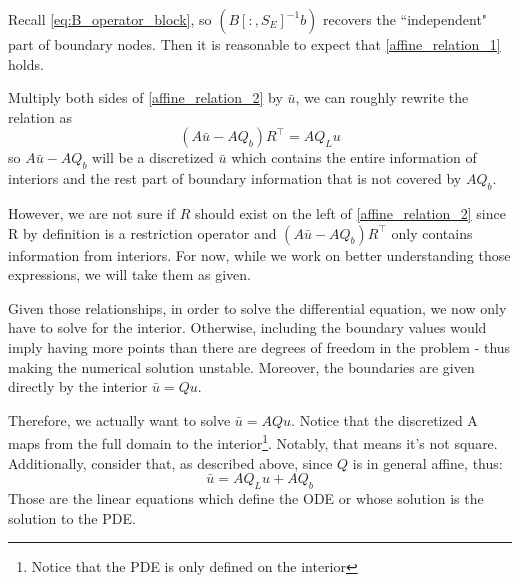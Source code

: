 \documentclass[11pt]{article}
\begin{document}
\begin{itemize}
		Recall \cref{eq:B_operator_block}, so $\left(B[:,S_E]^{-1} b \right)$ recovers the ``independent" part of boundary nodes. Then it is reasonable to expect that \cref{affine_relation_1} holds.

	Multiply both sides of \cref{affine_relation_2} by $\bar{u}$, we can roughly rewrite the relation as
	\begin{equation}
	(A \bar{u}-A  Q_b)  R^{\top} = A  Q_L u
	\end{equation}
	so $A \bar{u}-A   Q_b$ will be a discretized $\bar{u}$ which contains the entire information of interiors and the rest part of boundary information that is not covered by $A  Q_b$.

	However, we are not sure if $R$ should exist on the left of \cref{affine_relation_2} since R by definition is a restriction operator and $(A  \bar{u}-A  Q_b) R^{\top}$ only contains information from interiors.
	For now, while we work on better understanding those expressions, we will take them as given.


	Given those relationships, in order to solve the differential equation, we now only have to solve for the interior. Otherwise, including the boundary values would imply having more points than there are degrees of freedom in the problem - thus making the numerical solution unstable. Moreover, the boundaries are given directly by the interior $\bar{u} = Q u$.

	Therefore, we actually want to solve $\bar{u} = A Q u$. Notice that the discretized A maps from the full domain to the interior\footnote{Notice that the PDE is only defined on the interior}. Notably, that means it's not square. Additionally, consider that, as described above, since $Q$ is in general affine, thus:
	\begin{equation}
	\bar{u} = A Q_L u + A Q_b
	\end{equation}
	Those are the linear equations which define the ODE or whose solution is the solution to the PDE.
\end{itemize}
\end{document}

